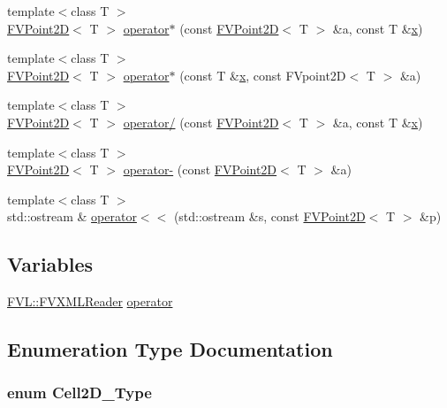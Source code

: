 \begin{DoxyCompactItemize}
{\footnotesize template$<$class T $>$ }\\\hyperlink{classFVL_1_1FVPoint2D}{FVPoint2D}$<$ T $>$ \hyperlink{namespaceFVL_a9182bd9a6593151a580c126b2b9a95a7}{operator$\ast$} (const \hyperlink{classFVL_1_1FVPoint2D}{FVPoint2D}$<$ T $>$ \&a, const T \&\hyperlink{FVL_2FVPoint2D_8h_a9a4f74af87a76a4c3dcb729cb0e68f8d}{x})
\item 
{\footnotesize template$<$class T $>$ }\\\hyperlink{classFVL_1_1FVPoint2D}{FVPoint2D}$<$ T $>$ \hyperlink{namespaceFVL_a2c00ee27a6efec77777d871f17c4a8ad}{operator$\ast$} (const T \&\hyperlink{FVL_2FVPoint2D_8h_a9a4f74af87a76a4c3dcb729cb0e68f8d}{x}, const FVpoint2D$<$ T $>$ \&a)
\item 
{\footnotesize template$<$class T $>$ }\\\hyperlink{classFVL_1_1FVPoint2D}{FVPoint2D}$<$ T $>$ \hyperlink{namespaceFVL_a101d709be4cbb8fbf4d3d6dea90b2e89}{operator/} (const \hyperlink{classFVL_1_1FVPoint2D}{FVPoint2D}$<$ T $>$ \&a, const T \&\hyperlink{FVL_2FVPoint2D_8h_a9a4f74af87a76a4c3dcb729cb0e68f8d}{x})
\item 
{\footnotesize template$<$class T $>$ }\\\hyperlink{classFVL_1_1FVPoint2D}{FVPoint2D}$<$ T $>$ \hyperlink{namespaceFVL_af2e46d2e39647630b0c1cc146298ef33}{operator-\/} (const \hyperlink{classFVL_1_1FVPoint2D}{FVPoint2D}$<$ T $>$ \&a)
\item 
{\footnotesize template$<$class T $>$ }\\std::ostream \& \hyperlink{namespaceFVL_a2c42a06efa3c35dd1fc72c25430a1b1c}{operator$<$$<$} (std::ostream \&s, const \hyperlink{classFVL_1_1FVPoint2D}{FVPoint2D}$<$ T $>$ \&p)
\end{DoxyCompactItemize}
\subsection*{Variables}
\begin{DoxyCompactItemize}
\item 
\hyperlink{classFVL_1_1FVXMLReader}{FVL::FVXMLReader} \hyperlink{namespaceFVL_aa44c792c5d125745a60768dc48554744}{operator}
\end{DoxyCompactItemize}


\subsection{Enumeration Type Documentation}
\hypertarget{namespaceFVL_aa77be52d0539533043f307505d0a8ec6}{
\subsubsection[{Cell2D\_\-Type}]{\setlength{\rightskip}{0pt plus 5cm}enum {\bf Cell2D\_\-Type}}}
\label{dd/d11/namespaceFVL_aa77be52d0539533043f307505d0a8ec6}


